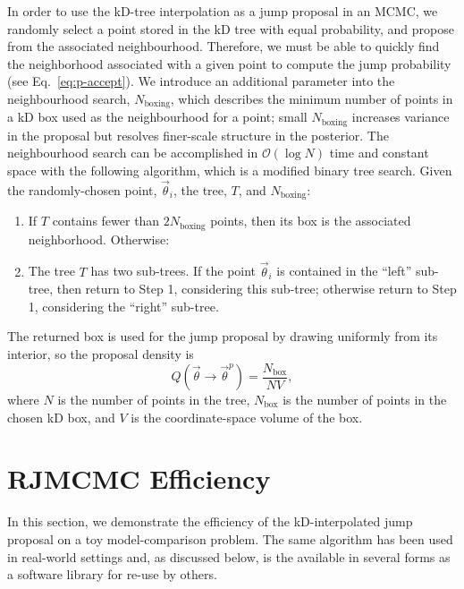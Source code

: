 \documentclass{rsos}
\newcommand{\vtheta}{\vec{\theta}}
\newcommand{\order}[1]{\mathcal{O}\left( #1 \right)}
\begin{document}
In order to use the kD-tree interpolation as a jump proposal in an
MCMC, we randomly select a point stored in the kD tree with equal
probability, and propose from the associated neighbourhood.
Therefore, we must be able to quickly find the neighborhood associated
with a given point to compute the jump probability (see
Eq.~\ref{eq:p-accept}).  We introduce an additional parameter into the
neighbourhood search, $N_\mathrm{boxing}$, which describes the minimum
number of points in a kD box used as the neighbourhood for a point;
small $N_\mathrm{boxing}$ increases variance in the proposal but
resolves finer-scale structure in the posterior.  The neighbourhood
search can be accomplished in $\order{\log N}$ time and constant space
with the following algorithm, which is a modified binary tree search.
Given the randomly-chosen point, $\vtheta_i$, the tree, $T$, and
$N_\mathrm{boxing}$:
\begin{enumerate}
\item If $T$ contains fewer than $2N_\mathrm{boxing}$ points, then
  its box is the associated neighborhood.  Otherwise:
\item The tree $T$ has two sub-trees.  If the point $\vtheta_i$ is
  contained in the ``left'' sub-tree, then return to Step 1,
  considering this sub-tree; otherwise return to Step 1, considering
  the ``right'' sub-tree.
\end{enumerate}
The returned box is used for the jump proposal by drawing uniformly
from its interior, so the proposal density is 
\begin{equation}
  \label{eq:neighbourhood-jp}
  Q(\vtheta \to \vtheta^p) = \frac{N_\mathrm{box}}{N V},
\end{equation}
where $N$ is the number of points in the tree, $N_\mathrm{box}$ is the
number of points in the chosen kD box, and $V$ is the coordinate-space
volume of the box.

\section{RJMCMC Efficiency}
\label{sec:efficiency}

In this section, we demonstrate the efficiency of the kD-interpolated
jump proposal on a toy model-comparison problem.  The same algorithm
has been used in real-world settings \cite{Farr2010} and, as discussed
below, is the available in several forms as a software library for
re-use by others.
\end{document}
